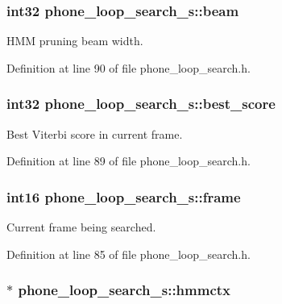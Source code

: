 \subsubsection[{beam}]{\setlength{\rightskip}{0pt plus 5cm}int32 phone\-\_\-loop\-\_\-search\-\_\-s\-::beam}\label{structphone__loop__search__s_a1aa6103c72ce8159bd21bfa4f97feff3}


H\-M\-M pruning beam width. 



Definition at line 90 of file phone\-\_\-loop\-\_\-search.\-h.

\subsubsection[{best\-\_\-score}]{\setlength{\rightskip}{0pt plus 5cm}int32 phone\-\_\-loop\-\_\-search\-\_\-s\-::best\-\_\-score}\label{structphone__loop__search__s_af6bf0231db2587a3f7ffa3f838b84db5}


Best Viterbi score in current frame. 



Definition at line 89 of file phone\-\_\-loop\-\_\-search.\-h.

\subsubsection[{frame}]{\setlength{\rightskip}{0pt plus 5cm}int16 phone\-\_\-loop\-\_\-search\-\_\-s\-::frame}\label{structphone__loop__search__s_a160e5fb9670d1870e5b21379a87bace5}


Current frame being searched. 



Definition at line 85 of file phone\-\_\-loop\-\_\-search.\-h.

\subsubsection[{hmmctx}]{$\ast$ phone\-\_\-loop\-\_\-search\-\_\-s\-::hmmctx}\label{structphone__loop__search__s_a67c44a95de79cb421fbeed4432686f48}


